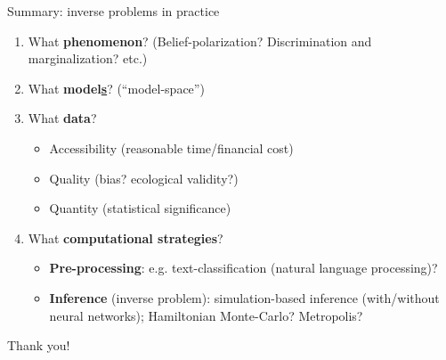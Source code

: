 \documentclass[10pt]{beamer}
\begin{document}
\begin{frame}{Summary: inverse problems in practice}
\begin{enumerate}
    \item What \textbf{phenomenon}? (Belief-polarization? Discrimination and marginalization? etc.)
    \item What \textbf{model\underline{s}}? (``model-space'')
    \item What \textbf{data}?
    \begin{itemize}
        \item Accessibility (reasonable time/financial cost)
        \item Quality (bias? ecological validity?)
        \item Quantity (statistical significance)
    \end{itemize}
    \item What \textbf{computational strategies}?
    \begin{itemize}
        \item \textbf{Pre-processing}: e.g. text-classification (natural language processing)?
        \item \textbf{Inference} (inverse problem): simulation-based inference (with/without neural networks); Hamiltonian Monte-Carlo? Metropolis?
    \end{itemize}
\end{enumerate}
\end{frame}


\begin{frame}[allowframebreaks]{Thank you!}
    \nocite{Cranmer2020,radev2021amortized}
    \printbibliography[heading=none]
\end{frame}
\end{document}
